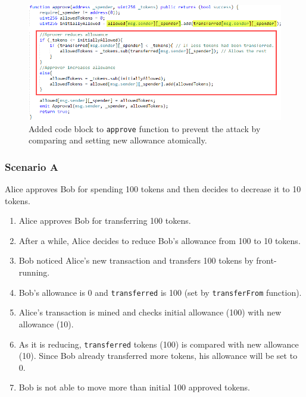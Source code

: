 \begin{figure}[t]
	\centering
	\includegraphics[width=1.0\linewidth]{figures/multiple_withdrawal_15.png}
	\caption{Added code block to \texttt{approve} function to prevent the attack by comparing and setting new allowance atomically.\label{fig:approve1}}
\end{figure}

\subsubsection*{Scenario A} Alice approves Bob for spending 100 tokens and then decides to decrease it to 10 tokens.
\begin{enumerate}
	\item Alice approves Bob for transferring 100 tokens.
	\item After a while, Alice decides to reduce Bob’s allowance from 100 to 10 tokens.
	\item Bob noticed Alice’s new transaction and transfers 100 tokens by front-running.
	\item Bob’s allowance is 0 and \texttt{transferred} is 100 (set by \texttt{transferFrom} function).
	\item Alice’s transaction is mined and checks initial allowance (100) with new allowance (10).
	\item As it is reducing, \texttt{transferred} tokens (100) is compared with new allowance (10). Since Bob already transferred more tokens, his allowance will be set to 0.
	\item Bob is not able to move more than initial 100 approved tokens.
\end{enumerate}

